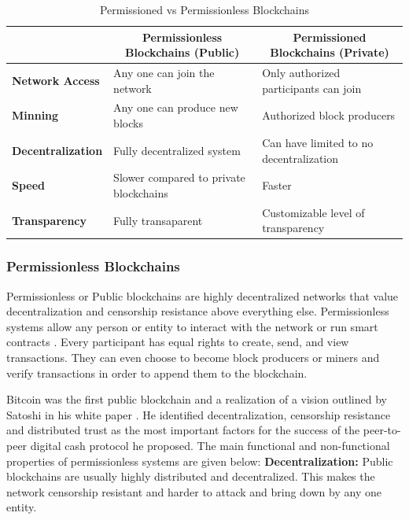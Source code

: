 \begin{table}[h]
\begin{tabular}{|l|l|l|}
\hline
                          & \multicolumn{1}{c|}{\textbf{Permissionless Blockchains (Public)}} & \multicolumn{1}{c|}{\textbf{Permissioned Blockchains (Private)}} \\ \hline
\textbf{Network Access}   & Any one can join the network                                      & Only authorized participants can join                            \\ \hline
\textbf{Minning}          & Any one can produce new blocks                                    & Authorized block producers                                       \\ \hline
\textbf{Decentralization} & Fully decentralized system                                        & Can have limited to no decentralization                          \\ \hline
\textbf{Speed}            & Slower compared to private blockchains                            & Faster                                                           \\ \hline
\textbf{Transparency}     & Fully transaparent                                                & Customizable level of transparency                               \\ \hline
\end{tabular}
\caption {Permissioned vs Permissionless Blockchains}
\end{table}
\vspace{1cm}
\subsubsection{Permissionless Blockchains} 
Permissionless or Public blockchains are highly decentralized networks that value decentralization and censorship resistance above everything else. Permissionless systems allow any person or entity to interact with the network or run smart contracts \cite{arXiv:1806.03693}. Every participant has equal rights to create, send, and view transactions. They can even choose to become block producers or miners and verify transactions in order to append them to the blockchain. 

Bitcoin was the first public blockchain and a realization of a vision outlined by Satoshi in his white paper \cite{paper:001}. He identified decentralization, censorship resistance and distributed trust as the most important factors for the success of the peer-to-peer digital cash protocol he proposed. The main functional and non-functional properties of permissionless systems are given below:
\clearpage
\textbf{Decentralization:}
Public blockchains are usually highly distributed and decentralized. This makes the network censorship resistant and harder to attack and bring down by any one entity. 

